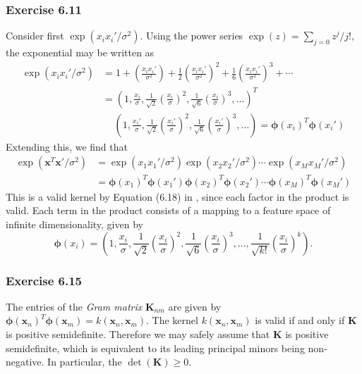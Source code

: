 \documentclass[12pt, a4paper]{article}
\newcommand{\vect}[1]{\bm{#1}}
\begin{document}
\subsubsection*{Exercise 6.11}
Consider first $\exp(x_i x_i' / \sigma^2)$.
Using the power series $\exp(z) = \sum_{j=0} z^j / j!$, the exponential may be written as
\begin{align*}
	\exp(x_i x_i' / \sigma^2)
	&=
	1
	+
	\left( \frac{x_i x_i'}{\sigma^2} \right)
	+
	\frac{1}{2} \left( \frac{x_i x_i'}{\sigma^2} \right)^2
	+
	\frac{1}{6} \left( \frac{x_i x_i'}{\sigma^2} \right)^3 + \cdots \\
	&= \left( 1, \frac{x_i}{\sigma}, 
	\frac{1}{\sqrt{2}} \left( \frac{x_i}{\sigma} \right)^2,
	\frac{1}{\sqrt{6}} \left( \frac{x_i}{\sigma} \right)^3 , \ldots \right)^T \\
	& \quad  \,\left( 1, \frac{x_i'}{\sigma}, 
	\frac{1}{\sqrt{2}} \left( \frac{x_i'}{\sigma} \right)^2,
	\frac{1}{\sqrt{6}} \left( \frac{x_i'}{\sigma} \right)^3 , \ldots \right)
	= \vect{\phi}(x_i)^T \vect{\phi}(x_i')
\end{align*}
Extending this, we find that
\begin{align*}
	\exp( \vect{x}^T \vect{x'} / \sigma^2)
	&=
	\exp( x_1 x_1' / \sigma^2)
	\exp( x_2 x_2' / \sigma^2)
	\cdots \exp( x_M x_M' / \sigma^2) \\
	&=
	\vect{\phi}(x_1)^T \vect{\phi}(x_1') 
	\vect{\phi}(x_2)^T \vect{\phi}(x_2') \cdots
	\vect{\phi}(x_M)^T \vect{\phi}(x_M')
\end{align*}
This is a valid kernel by Equation (6.18) in \cite{bishop_pattern_2011}, since each factor in the product is valid.
Each term in the product consists of a mapping to a feature space of infinite dimensionality, given by
\begin{equation*}
	\vect{\phi}(x_i)  = \left( 1, \frac{x_i}{\sigma}, 
	\frac{1}{\sqrt{2}} \left( \frac{x_i}{\sigma} \right)^2,
	\frac{1}{\sqrt{6}} \left( \frac{x_i}{\sigma} \right)^3 , \ldots,
	\frac{1}{\sqrt{k!}} \left( \frac{x_i}{\sigma} \right)^k \right).
\end{equation*}


\subsubsection*{Exercise 6.15}
The entries of the \emph{Gram matrix} $\vect{K}_{nm}$ are given by $\vect{\phi}(\vect{x}_n)^T \vect{\phi}(\vect{x}_m) = k (\vect{x}_n, \vect{x}_m)$.
The kernel $k (\vect{x}_n, \vect{x}_m)$ is valid if and only if $\vect{K}$ is positive semidefinite.
Therefore we may safely assume that $\vect{K}$ is positive semidefinite, which is equivalent to its leading principal minors being non-negative.
In particular, the $\det (\vect{K}) \geq 0$.
\end{document}
